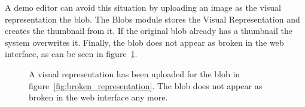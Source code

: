 A demo editor can avoid this situation by uploading an image as the visual representation the blob. The Blobs module stores the Visual Representation and creates the thumbnail from it. If the original blob already has a thumbnail the system overwrites it. Finally, the blob does not appear as broken in the web interface, as can be seen in figure~\ref{fig:visual_representation}.
%
\begin{figure}[h]
\centering
{}
\caption{A visual representation has been uploaded for the blob in figure~\ref{fig:broken_representation}. The blob does not appear as broken in the web interface any more.} 
\label{fig:visual_representation}
\end{figure}
%


